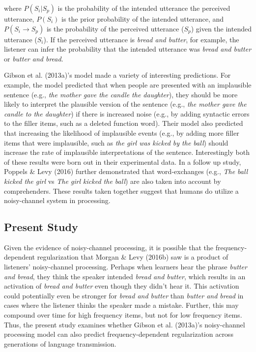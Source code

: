 \documentclass[10pt, letterpaper]{article}
\begin{document}
\noindent where \(P(S_i|S_p)\) is the probability of the intended
utterance the perceived utterance, \(P(S_i)\) is the prior probability
of the intended utterance, and \(P(S_i \to S_p)\) is the probability of
the perceived utterance (\(S_p\)) given the intended utterance
(\(S_i\)). If the perceived utterance is \emph{bread and butter}, for
example, the listener can infer the probability that the intended
utterance was \emph{bread and butter} or \emph{butter and bread}.

Gibson et al. (2013a)'s model made a variety of interesting predictions.
For example, the model predicted that when people are presented with an
implausible sentence (e.g., \emph{the mother gave the candle the
daughter}), they should be more likely to interpret the plausible
version of the sentence (e.g., \emph{the mother gave the candle to the
daughter}) if there is increased noise (e.g., by adding syntactic errors
to the filler items, such as a deleted function word). Their model also
predicted that increasing the likelihood of implausible events (e.g., by
adding more filler items that were implausible, such as \emph{the girl
was kicked by the ball}) should increase the rate of implausible
interpretations of the sentence. Interestingly both of these results
were born out in their experimental data. In a follow up study, Poppels
\& Levy (2016) further demonstrated that word-exchanges (e.g., \emph{The
ball kicked the girl} vs \emph{The girl kicked the ball}) are also taken
into account by comprehenders. These results taken together suggest that
humans do utilize a noisy-channel system in processing.

\hypertarget{present-study}{%
\subsection{Present Study}\label{present-study}}

Given the evidence of noisy-channel processing, it is possible that the
frequency-dependent regularization that Morgan \& Levy (2016b) saw is a
product of listeners' noisy-channel processing. Perhaps when learners
hear the phrase \emph{butter and bread}, they think the speaker intended
\emph{bread and butter}, which results in an activation of \emph{bread
and butter} even though they didn't hear it. This activation could
potentially even be stronger for \emph{bread and butter} than
\emph{butter and bread} in cases where the listener thinks the speaker
made a mistake. Further, this may compound over time for high frequency
items, but not for low frequency items. Thus, the present study examines
whether Gibson et al. (2013a)'s noisy-channel processing model can also
predict frequency-dependent regularization across generations of
language transmission.
\end{document}
